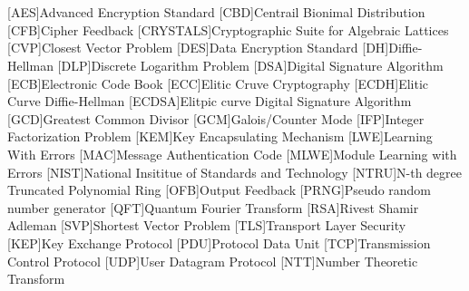 \cleardoublepage
\chapter*{\listofabbrevname}
{}

\begin{acronym}[mmmmmmm]
	[AES]{Advanced Encryption Standard}
	[CBD]{Centrail Bionimal Distribution}
	[CFB]{Cipher Feedback}
	[CRYSTALS]{Cryptographic Suite for Algebraic Lattices}
	[CVP]{Closest Vector Problem}
	[DES]{Data Encryption Standard}
	[DH]{Diffie-Hellman}
	[DLP]{Discrete Logarithm Problem}
	[DSA]{Digital Signature Algorithm}
	[ECB]{Electronic Code Book}
	[ECC]{Elitic Cruve Cryptography}
	[ECDH]{Elitic Curve Diffie-Hellman}
	[ECDSA]{Elitpic curve Digital Signature Algorithm}
	[GCD]{Greatest Common Divisor}
	[GCM]{Galois/Counter Mode}
	[IFP]{Integer Factorization Problem}
	[KEM]{Key Encapsulating Mechanism}
	[LWE]{Learning With Errors}
	[MAC]{Message Authentication Code}
	[MLWE]{Module Learning with Errors}
	[NIST]{National Insititue of Standards and Technology}
	[NTRU]{N-th degree Truncated Polynomial Ring}
	[OFB]{Output Feedback}
	[PRNG]{Pseudo random number generator}
	[QFT]{Quantum Fourier Transform}
	[RSA]{Rivest Shamir Adleman}
	[SVP]{Shortest Vector Problem}
	[TLS]{Transport Layer Security}
  [KEP]{Key Exchange Protocol}
  [PDU]{Protocol Data Unit}
  [TCP]{Transmission Control Protocol}
  [UDP]{User Datagram Protocol}
	[NTT]{Number Theoretic Transform}
\end{acronym}
